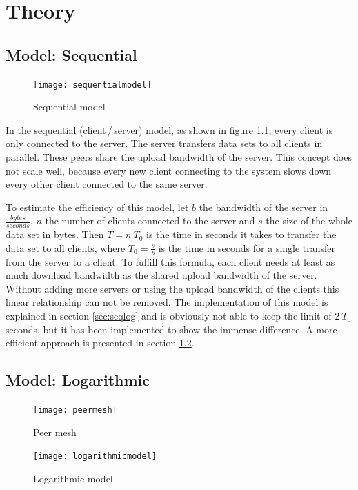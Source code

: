 \chapter{Theory}
\label{ch:theory}

\section{Model: Sequential}
\label{sec:sequentialmodel}

\begin{figure}[ht]
	\centering
	\texttt{[image: sequentialmodel]}
	\caption{Sequential model}
	\label{fig:sequentialmodel}
\end{figure}

In the sequential (client\,/\,server) model, as shown in figure \ref{fig:sequentialmodel}, every client is only connected to the server. The server transfers data sets to all clients in parallel. These peers share the upload bandwidth of the server. This concept does not scale well, because every new client connecting to the system slows down every other client connected to the same server. 

To estimate the efficiency of this model, let $b$ the bandwidth of the server in $\frac{bytes}{seconds}$, $n$ the number of clients connected to the server and $s$ the size of the whole data set in bytes. Then $T= n\:T_0$ is the time in seconds it takes to transfer the data set to all clients, where $T_0=\frac{s}{b}$ is the time in seconds for a single transfer from the server to a client. To fulfill this formula, each client needs at least as much download bandwidth as the shared upload bandwidth of the server. Without adding more servers or using the upload bandwidth of the clients this linear relationship can not be removed. The implementation of this model is explained in section \ref{sec:seqlog} and is obviously not able to keep the limit of $2\:T_0$ seconds, but it has been implemented to show the immense difference. A more efficient approach is presented in section \ref{sec:logarithmicmodel}.

\pagebreak
\section{Model: Logarithmic}
\label{sec:logarithmicmodel}

\begin{figure} [ht]
	\centering
	\begin{minipage}[b]{0.4\linewidth}
		\texttt{[image: peermesh]}
		\caption{Peer mesh}
		\label{fig:peermesh}
	\end{minipage}
	\hspace{0.1\linewidth}
	\begin{minipage}[b]{0.4\linewidth}
		\texttt{[image: logarithmicmodel]}
		\caption{Logarithmic model}
		\label{fig:logarithmicmodel}
	\end{minipage}

\end{figure}



